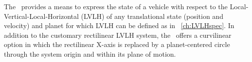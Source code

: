 %
%
%
%



The \LRDSDesc\ provides a means to express the state of a vehicle
with respect to the Local-Vertical-Local-Horizontal (LVLH) of any
translational state (position and velocity) and planet for which LVLH can be
defined as in ~\ref{ch:LVLHspec}. In addition to the customary rectilinear
LVLH system, the \LRDSDesc\ offers a curvilinear option in which the
rectilinear X-axis is replaced by a planet-centered circle through the
system origin and within its plane of motion.

